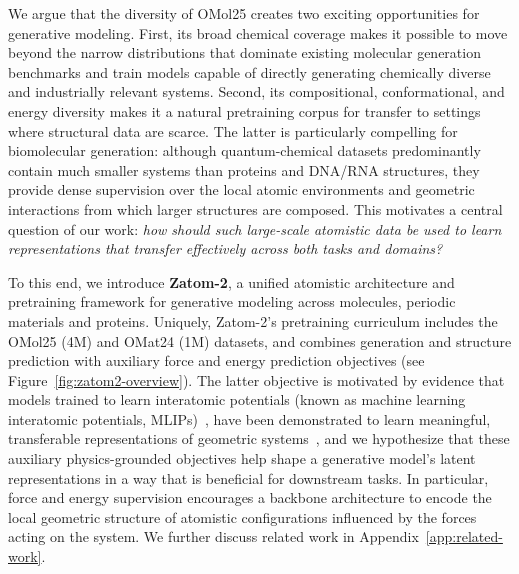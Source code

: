 \documentclass{article} %
\begin{document}
We argue that the diversity of OMol25 creates two exciting opportunities for generative modeling. First, its broad chemical coverage makes it possible to move beyond the narrow distributions that dominate existing molecular generation benchmarks and train models capable of directly generating chemically diverse and industrially relevant systems. Second, its compositional, conformational, and energy diversity makes it a natural pretraining corpus for transfer to settings where structural data are scarce. The latter is particularly compelling for biomolecular generation: although quantum-chemical datasets predominantly contain much smaller systems than proteins and DNA/RNA structures, they provide dense supervision over the local atomic environments and geometric interactions from which larger structures are composed. This motivates a central question of our work: \emph{how should such large-scale atomistic data be used to learn representations that transfer effectively across both tasks and domains?}

To this end, we introduce \textbf{Zatom-2}, a unified atomistic architecture and pretraining framework for generative modeling across molecules, periodic materials and proteins. Uniquely, Zatom-2's pretraining curriculum includes the OMol25 (4M) and OMat24 (1M) datasets, and combines generation and structure prediction with auxiliary force and energy prediction objectives (see Figure~\ref{fig:zatom2-overview}). The latter objective is motivated by evidence that models trained to learn interatomic potentials (known as machine learning interatomic potentials, MLIPs)~\citep{Batatia2022mace,wood2025uma,neumann2024orb,qu2026allscaip}, have been demonstrated to learn meaningful, transferable representations of geometric systems~\citep{wedig2025rem3di,li2026platonic,didi2026r4g}, and we hypothesize that these auxiliary physics-grounded objectives help shape a generative model's latent representations in a way that is beneficial for downstream tasks. In particular, force and energy supervision encourages a backbone architecture to encode the local geometric structure of atomistic configurations influenced by the forces acting on the system. We further discuss related work in Appendix~\ref{app:related-work}.
\end{document}
